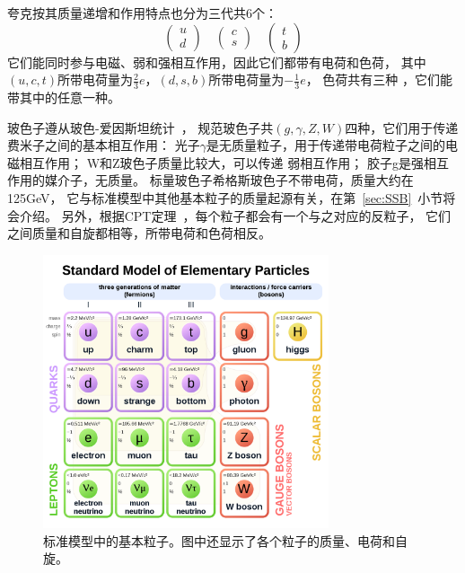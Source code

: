 夸克按其质量递增和作用特点也分为三代共6个：
\begin{equation} 
\label{eq:EP2}
\left( \begin{aligned}
u\\ d
\end{aligned}
\right)
\quad
\left( \begin{aligned}
c\\ s
\end{aligned}
\right)
\quad
\left( \begin{aligned}
t\\ b
\end{aligned}
\right)
\end{equation}
它们能同时参与电磁、弱和强相互作用，因此它们都带有电荷和色荷，
其中$(u,c,t)$所带电荷量为$\frac{2}{3}e$，$(d,s,b)$所带电荷量为$-\frac{1}{3}e$，
色荷共有三种
，它们能带其中的任意一种。

玻色子遵从玻色-爱因斯坦统计~\cite{BOSON}，
规范玻色子共$(g,\gamma,Z,W)$四种，它们用于传递费米子之间的基本相互作用：
光子$\gamma$是无质量粒子，用于传递带电荷粒子之间的电磁相互作用；
W和Z玻色子质量比较大，可以传递
弱相互作用；
胶子g是强相互作用的媒介子，无质量。
标量玻色子希格斯玻色子不带电荷，质量大约在125GeV，
它与标准模型中其他基本粒子的质量起源有关，在第~\ref{sec:SSB}~小节将会介绍。
另外，根据CPT定理~\cite{CPT1,CPT2}，每个粒子都会有一个与之对应的反粒子，
它们之间质量和自旋都相等，所带电荷和色荷相反。

\begin{figure}
  \begin{center}
    \includegraphics[width=0.75\textwidth]{figuresTHE/SM1.png}
  \end{center}
  \caption{ 标准模型中的基本粒子。图中还显示了各个粒子的质量、电荷和自旋。}
    \label{fig:SM1}
\end{figure}

